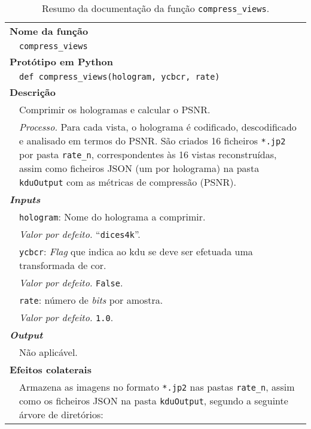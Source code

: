 \begin{table}[!htbp]
    \centering
    \caption{Resumo da documentação da função \texttt{compress\_views}.}
    \label{tab:compress_views}
    \begin{tabular}{p{1cm} p{10cm}}
        \hline
        \multicolumn{2}{l}{\bfseries Nome da função}\\
         & \verb|compress_views|\\
        \hline
        \multicolumn{2}{l}{\bfseries Protótipo em Python}\\
         & \texttt{def compress_views(hologram, ycbcr, rate)} \\
        \hline\multicolumn{2}{l}{\bfseries Descrição}\\
         & Comprimir os hologramas e calcular o \ac{PSNR}. \\
         & \textit{Processo.} Para cada vista, o holograma é codificado, descodificado e analisado em termos do \ac{PSNR}. São criados 16 ficheiros \verb|*.jp2| por pasta \verb|rate_n|, correspondentes às 16 vistas reconstruídas, assim como ficheiros JSON (um por holograma) na pasta \verb|kduOutput| com as métricas de compressão (\ac{PSNR}). \\
        \hline\multicolumn{2}{l}{\bfseries \textit{Inputs}}\\
         & \verb|hologram|: Nome do holograma a comprimir.\\
         & \hspace{1cm} \textit{Valor por defeito.} ``\verb|dices4k|''.\\
         & \verb|ycbcr|: \textit{Flag} que indica ao \ac{kdu} se deve ser efetuada uma transformada de cor.\\
         & \hspace{1cm} \textit{Valor por defeito.} \verb|False|.\\
         & \verb|rate|: número de \textit{bits} por amostra.\\
         & \hspace{1cm} \textit{Valor por defeito.} \verb|1.0|.\\
        \hline\multicolumn{2}{l}{\bfseries \textit{Output}}\\
         & Não aplicável.\\
        \hline\multicolumn{2}{l}{\bfseries Efeitos colaterais}\\
         & Armazena as imagens no formato \verb|*.jp2| nas pastas \verb|rate_n|, assim como os ficheiros JSON na pasta \verb|kduOutput|, segundo a seguinte árvore de diretórios:\\

\end{tabular}
\end{table}
